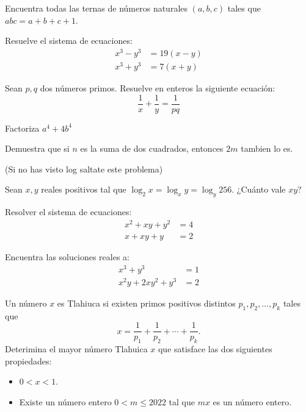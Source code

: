 \documentclass[11pt]{scrartcl}
\begin{document}
\begin{problem}
    Encuentra todas las ternas de números naturales $(a,b,c)$ tales que $abc=a+b+c+1$.
    
\end{problem}

\begin{problem}
    Resuelve el sistema de ecuaciones:
    \begin{align*}
        x^3-y^3&=19(x-y)\\
        x^3+y^3&=7(x+y)
    \end{align*}
\end{problem}


\begin{problem}
Sean $p,q$ dos números primos. Resuelve en enteros la siguiente ecuación:
\[ \frac 1x +\frac 1y = \frac{1}{pq}\]
\end{problem}

\begin{problem} %
    Factoriza $a^4+4b^4$
\end{problem}

\begin{problem}
    Demuestra que si $n$ es la suma de dos cuadrados, entonces $2m$ tambien lo es.
\end{problem}

(Si no has visto log saltate este problema)
\begin{problem}
    Sean $x,y$ reales positivos tal que $\log_2 x =\log_x y = \log_y 256$. ¿Cuánto vale $xy$?
\end{problem}   

\begin{problem} %
    Resolver el sistema de ecuaciones:
    \begin{align*}
        x^2+xy+y^2&=4 \\
        x+xy+y&=2 
    \end{align*}
\end{problem}

\begin{problem}
    Encuentra las soluciones reales a:
    \begin{align*}
        x^3+y^3 &=1 \\
        x^2y+2xy^2+y^3 &= 2 
    \end{align*}    
\end{problem}

\begin{problem}
    Un número $x$ es Tlahiuca si existen primos positivos distintos $p_1,p_2,\dots,p_k$ tales que 
\[x=\frac{1}{p_1}+\frac{1}{p_2}+\cdots+\frac{1}{p_k}.\]
Deterimina el mayor número Tlahuica $x$ que satisface las dos siguientes propiedades:
 \begin{itemize} 
 \item  $0 < x < 1$. 
 \item  Existe un número entero $0< m\leq 2022$ tal que $mx$ es un número entero. 
 \end{itemize} 
    
\end{problem}
\end{document}
